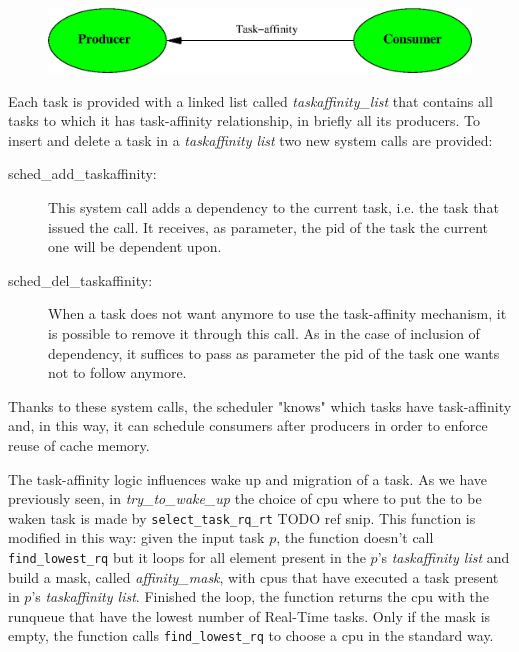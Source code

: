 \begin{figure}[htbp]
\centering
\includegraphics[width=\widefigure]{images/taskaff-rel.eps}
\caption{}
\label{fig:taskaff-rel}
\end{figure}

Each task is provided with a linked list called \textit{taskaffinity\_list} that contains all tasks to which it has task-affinity relationship, in briefly 
all its producers. To insert and delete a task in a \textit{taskaffinity list} two new system calls are provided:

\begin{description}

\item[sched\_add\_taskaffinity:] This system call adds a dependency to the current task, i.e. the task that issued the call. It receives, as parameter, the 
pid of the task the current one will be dependent upon.

\item[sched\_del\_taskaffinity:] When a task does not want anymore to use the task-affinity mechanism, it is possible to remove it through this call.
As in the case of inclusion of dependency, it suffices to pass as parameter the pid of the task one wants not to follow anymore.

\end{description}

Thanks to these system calls, the scheduler "knows" which tasks have task-affinity and, in this way, it can schedule consumers after producers in order to 
enforce reuse of cache memory.

The task-affinity logic influences wake up and migration of a task. As we have previously seen, in \textit{try\_to\_wake\_up} the choice of cpu where to 
put the to be waken task is made by \texttt{select\_task\_rq\_rt} TODO ref snip. This function is modified in this way: given the input task $p$, the 
function doesn't call \texttt{find\_lowest\_rq} but it loops for all element present in the $p$'s \textit{taskaffinity list} and build a mask, called 
\textit{affinity\_mask}, with cpus that have executed a task present in $p$'s \textit{taskaffinity list}. Finished the loop, the function returns the cpu 
with the runqueue that have the lowest number of Real-Time tasks. Only if the mask is empty, the function calls \texttt{find\_lowest\_rq} to choose a cpu
in the standard way. 

